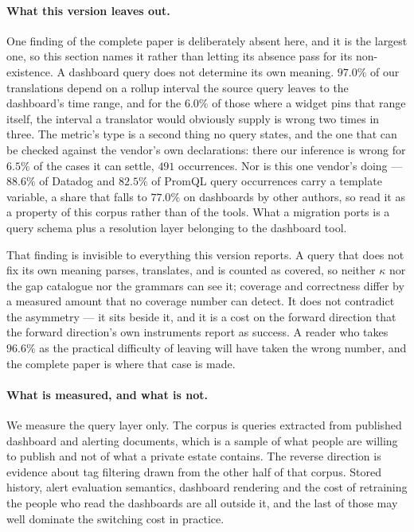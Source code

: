 \paragraph{What this version leaves out.}
One finding of the complete paper is deliberately absent here, and it is the largest one,
so this section names it rather than letting its absence pass for its non-existence. A
dashboard query does not determine its own meaning. $97.0\%$ of our translations depend on
a rollup interval the source query leaves to the dashboard's time range, and for the
$6.0\%$ of those where a widget pins that range itself, the interval a translator would
obviously supply is wrong two times in three. The metric's type is a second thing no query
states, and the one that can be checked against the vendor's own declarations: there our
inference is wrong for $6.5\%$ of the cases it can settle, $491$ occurrences. Nor is this
one vendor's doing --- $88.6\%$ of Datadog and $82.5\%$ of PromQL query occurrences carry a
template variable, a share that falls to $77.0\%$ on dashboards by other authors, so read
it as a property of this corpus rather than of the tools. What a migration ports is a query
schema plus a resolution layer belonging to the dashboard tool.

That finding is invisible to everything this version reports. A query that does not fix its
own meaning parses, translates, and is counted as covered, so neither $\kappa$ nor the gap
catalogue nor the grammars can see it; coverage and correctness differ by a measured amount
that no coverage number can detect. It does not contradict the asymmetry --- it sits beside
it, and it is a cost on the forward direction that the forward direction's own instruments
report as success. A reader who takes $96.6\%$ as the practical difficulty of leaving will
have taken the wrong number, and the complete paper is where that case is made.

\paragraph{What is measured, and what is not.}
We measure the query layer only. The corpus is queries extracted from published dashboard
and alerting documents, which is a sample of what people are willing to publish and not of
what a private estate contains. The reverse direction is evidence about tag filtering drawn
from the other half of that corpus. Stored history, alert evaluation semantics, dashboard
rendering and the cost of retraining the people who read the dashboards are all outside
it, and the last of those may well dominate the switching cost in practice.
